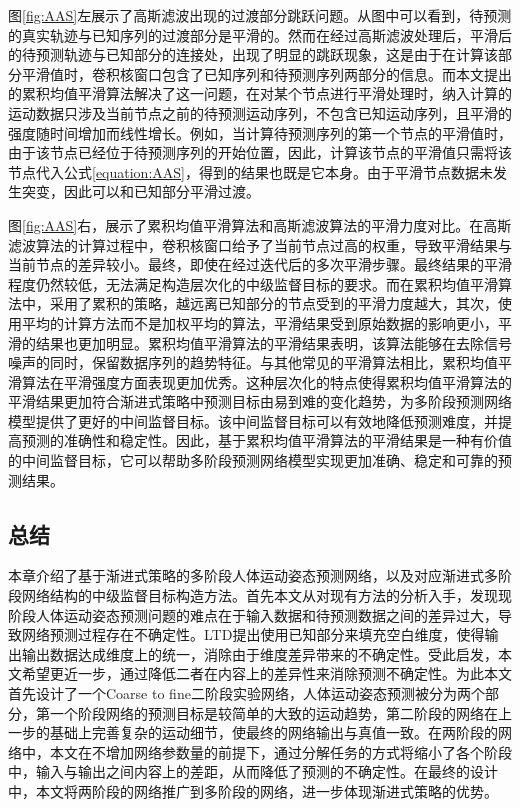 图\ref{fig:AAS}左展示了高斯滤波出现的过渡部分跳跃问题。从图中可以看到，待预测的真实轨迹与已知序列的过渡部分是平滑的。然而在经过高斯滤波处理后，平滑后的待预测轨迹与已知部分的连接处，出现了明显的跳跃现象，这是由于在计算该部分平滑值时，卷积核窗口包含了已知序列和待预测序列两部分的信息。而本文提出的累积均值平滑算法解决了这一问题，在对某个节点进行平滑处理时，纳入计算的运动数据只涉及当前节点之前的待预测运动序列，不包含已知运动序列，且平滑的强度随时间增加而线性增长。例如，当计算待预测序列的第一个节点的平滑值时，由于该节点已经位于待预测序列的开始位置，因此，计算该节点的平滑值只需将该节点代入公式\ref{equation:AAS}，得到的结果也既是它本身。由于平滑节点数据未发生突变，因此可以和已知部分平滑过渡。

图\ref{fig:AAS}右，展示了累积均值平滑算法和高斯滤波算法的平滑力度对比。在高斯滤波算法的计算过程中，卷积核窗口给予了当前节点过高的权重，导致平滑结果与当前节点的差异较小。最终，即使在经过迭代后的多次平滑步骤。最终结果的平滑程度仍然较低，无法满足构造层次化的中级监督目标的要求。而在累积均值平滑算法中，采用了累积的策略，越远离已知部分的节点受到的平滑力度越大，其次，使用平均的计算方法而不是加权平均的算法，平滑结果受到原始数据的影响更小，平滑的结果也更加明显。累积均值平滑算法的平滑结果表明，该算法能够在去除信号噪声的同时，保留数据序列的趋势特征。与其他常见的平滑算法相比，累积均值平滑算法在平滑强度方面表现更加优秀。这种层次化的特点使得累积均值平滑算法的平滑结果更加符合渐进式策略中预测目标由易到难的变化趋势，为多阶段预测网络模型提供了更好的中间监督目标。该中间监督目标可以有效地降低预测难度，并提高预测的准确性和稳定性。因此，基于累积均值平滑算法的平滑结果是一种有价值的中间监督目标，它可以帮助多阶段预测网络模型实现更加准确、稳定和可靠的预测结果。

\subsection{总结}
本章介绍了基于渐进式策略的多阶段人体运动姿态预测网络，以及对应渐进式多阶段网络结构的中级监督目标构造方法。首先本文从对现有方法的分析入手，发现现阶段人体运动姿态预测问题的难点在于输入数据和待预测数据之间的差异过大，导致网络预测过程存在不确定性。LTD提出使用已知部分来填充空白维度，使得输出输出数据达成维度上的统一，消除由于维度差异带来的不确定性。受此启发，本文希望更近一步，通过降低二者在内容上的差异性来消除预测不确定性。为此本文首先设计了一个Coarse to fine二阶段实验网络，人体运动姿态预测被分为两个部分，第一个阶段网络的预测目标是较简单的大致的运动趋势，第二阶段的网络在上一步的基础上完善复杂的运动细节，使最终的网络输出与真值一致。在两阶段的网络中，本文在不增加网络参数量的前提下，通过分解任务的方式将缩小了各个阶段中，输入与输出之间内容上的差距，从而降低了预测的不确定性。在最终的设计中，本文将两阶段的网络推广到多阶段的网络，进一步体现渐进式策略的优势。

